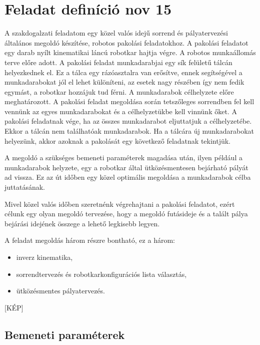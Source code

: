 \chapter{Feladat definíció nov 15}

A szakdogalzati feladatom egy közel valós idejű sorrend és pályatervezési általános megoldó készítése, robotos pakolási feladatokhoz. 
A pakolási feladatot egy darab nyílt kinematikai láncú robotkar hajtja végre. A robotos munkaállomás terve előre adott. A pakolási feladat munkadarabjai egy sík felületű tálcán helyezkednek el. Ez a tálca egy rázóasztalra van erősítve, ennek segítségével a munkadarabokat jól el lehet különíteni, az esetek nagy részében így nem fedik egymást, a robotkar hozzájuk tud férni. 
A munkadarabok célhelyzete előre meghatározott. A pakolási feladat megoldása során tetszőleges sorrendben fel kell vennünk az egyes munkadarabokat és a célhelyzetükbe kell vinnünk őket. A pakolási feladatnak vége, ha az összes munkadarabot eljuttatjuk a célhelyzetébe. Ekkor a tálcán nem találhatóak munkadarabok. Ha a tálcára új munkadarabokat helyezünk, akkor azoknak a pakolását egy következő feladatnak tekintjük.

A megoldó a szükséges bemeneti paraméterek magadása után, ilyen például a munkadarabok helyzete, egy a robotkar által ütközésmentesen bejárható pályát ad vissza. Ez az út időben egy közel optimális megoldása a munkadarabok célba juttatásának.

Mivel közel valós időben szeretnénk végrehajtani a pakolási feladatot, ezért célunk egy olyan megoldó tervezése, hogy a megoldó futásideje és a talált pálya bejárási idejének összege a lehető legkisebb legyen.

A feladat megoldás három részre bontható, ez a három: 
\begin{itemize}
\item {inverz kinematika,} %
\item {sorrendtervezés és robotkarkonfigurációs lista választás,} 
\item {ütközésmentes pályatervezés.}  
\end{itemize}

[KÉP]

\section{Bemeneti paraméterek}

